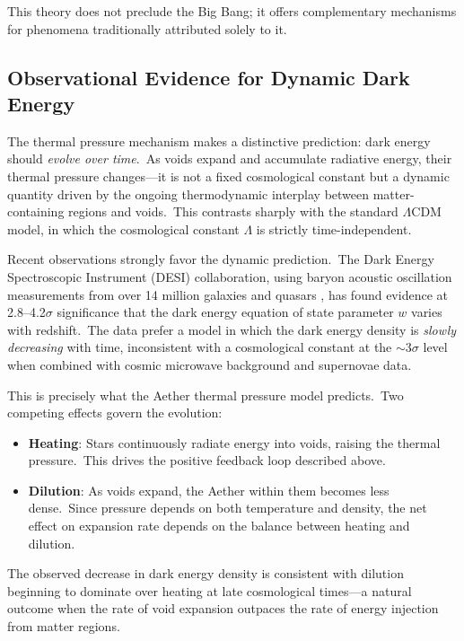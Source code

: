 ﻿\documentclass[12pt,letterpaper]{article}
\begin{document}
This theory does not preclude the Big Bang; it offers complementary mechanisms
for phenomena traditionally attributed solely to it.


\subsection{Observational Evidence for Dynamic Dark Energy}

The thermal pressure mechanism makes a distinctive prediction: dark energy should
\emph{evolve over time}.\ As voids expand and accumulate radiative energy, their
thermal pressure changes---it is not a fixed cosmological constant but a dynamic
quantity driven by the ongoing thermodynamic interplay between matter-containing
regions and voids.\ This contrasts sharply with the standard $\Lambda$CDM model,
in which the cosmological constant $\Lambda$ is strictly time-independent.

Recent observations strongly favor the dynamic prediction.\ The Dark Energy
Spectroscopic Instrument (DESI) collaboration, using baryon acoustic oscillation
measurements from over 14 million galaxies and quasars \cite{desi2025}, has found
evidence at 2.8--4.2$\sigma$ significance that the dark energy equation of state
parameter $w$ varies with redshift.\ The data prefer a model in which the dark energy
density is \emph{slowly decreasing} with time, inconsistent with a cosmological
constant at the $\sim$3$\sigma$ level when combined with cosmic microwave background
and supernovae data.

This is precisely what the Aether thermal pressure model predicts.\ Two competing
effects govern the evolution:
%
\begin{itemize}[leftmargin=2em]
  \item \textbf{Heating}: Stars continuously radiate energy into voids, raising
    the thermal pressure.\ This drives the positive feedback loop described above.

  \item \textbf{Dilution}: As voids expand, the Aether within them becomes less
    dense.\ Since pressure depends on both temperature and density, the net effect
    on expansion rate depends on the balance between heating and dilution.
\end{itemize}
%
The observed decrease in dark energy density is consistent with dilution beginning
to dominate over heating at late cosmological times---a natural outcome when the
rate of void expansion outpaces the rate of energy injection from matter regions.
\end{document}
